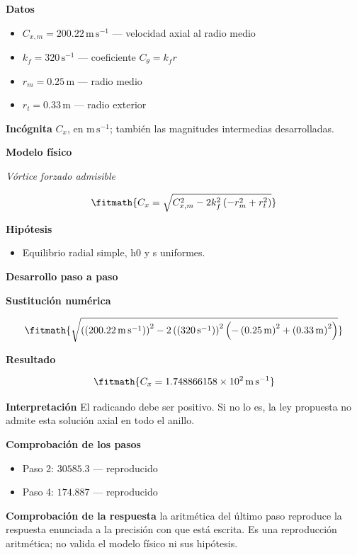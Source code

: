 \documentclass[10pt,openany]{book}
\begin{document}
\noindent\textbf{Datos}
\begin{itemize}
\item $C_{x,m} = 200.22\,\mathrm{m}\,\mathrm{s}^{-1}$ — velocidad axial al radio medio
\item $k_f = 320\,\mathrm{s}^{-1}$ — coeficiente $C_\theta=k_f r$
\item $r_m = 0.25\,\mathrm{m}$ — radio medio
\item $r_t = 0.33\,\mathrm{m}$ — radio exterior
\end{itemize}

\noindent\textbf{Incógnita}
$C_x$, en $\mathrm{m\,s^{-1}}$; también las magnitudes intermedias desarrolladas.

\noindent\textbf{Modelo físico}

\noindent\textit{Vórtice forzado admisible}

\[
\fitmath{C_x=\sqrt{C_{x,m}^{2} - 2 k_f^{2} \left(- r_m^{2} + r_t^{2}\right)}}
\]

\noindent\textbf{Hipótesis}
\begin{itemize}
\item Equilibrio radial simple, h0 y s uniformes.
\end{itemize}

\noindent\textbf{Desarrollo paso a paso}



\noindent\textbf{Sustitución numérica}

\[
\fitmath{\sqrt{\left(\left(200.22\,\mathrm{m}\,\mathrm{s}^{-1}\right)\right)^{2} - 2 \left(\left(320\,\mathrm{s}^{-1}\right)\right)^{2} \left(- \left(0.25\,\mathrm{m}\right)^{2} + \left(0.33\,\mathrm{m}\right)^{2}\right)}}
\]

\noindent\textbf{Resultado}

\[
\fitmath{C_x=1.748866158\times10^{2}\,\mathrm{m}\,\mathrm{s}^{-1}}
\]

\noindent\textbf{Interpretación}
El radicando debe ser positivo. Si no lo es, la ley propuesta no admite esta solución axial en todo el anillo.

\noindent\textbf{Comprobación de los pasos}
\begin{itemize}
\item Paso 2: $30585.3$ — reproducido
\item Paso 4: $174.887$ — reproducido
\end{itemize}

\noindent\textbf{Comprobación de la respuesta} la aritmética del último paso reproduce la respuesta enunciada a la precisión con que está escrita. Es una reproducción aritmética; no valida el modelo físico ni sus hipótesis.
\end{document}
